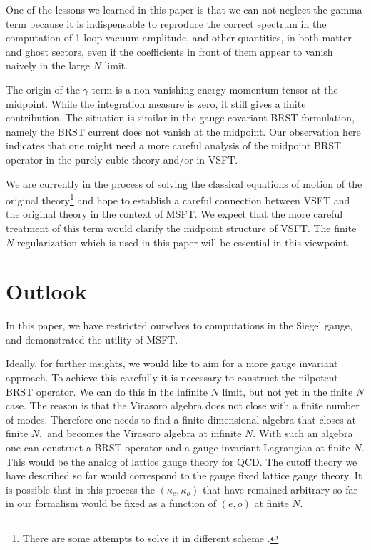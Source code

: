 \documentclass[a4paper,11pt]{article}
\begin{document}
One of the lessons we learned in this paper is that we can not
neglect the gamma term because it is indispensable to reproduce
the correct spectrum in the computation of 1-loop vacuum
amplitude, and other quantities, in both matter and ghost sectors,
even if the coefficients in front of them appear to vanish naively
in the large $N$ limit.

The origin of the $\gamma$ term is a non-vanishing energy-momentum
tensor at the midpoint.  While the integration measure is zero, it
still gives a finite contribution. The situation is similar in the
gauge covariant BRST formulation, namely the BRST current does not
vanish at the midpoint. Our observation here indicates that one
might need a more careful analysis of the midpoint BRST operator
in the purely cubic theory and/or in VSFT.

We are currently in the process of solving the classical equations of
motion of the original theory\footnote{%
There are some attempts to solve it in different scheme
\cite{solution}.} and hope to establish a careful connection
between VSFT and the original theory in the context of MSFT. We
expect that the more careful treatment of this term would clarify
the midpoint structure of VSFT. The finite $N$ regularization
which is used in this paper will be essential in this viewpoint.

\section{Outlook}

In this paper, we have restricted ourselves to computations in the Siegel
gauge, and demonstrated the utility of MSFT.

Ideally, for further insights, we would like to aim for a more gauge
invariant approach. To achieve this carefully it is necessary to construct
the nilpotent BRST operator. We can do this in the infinite $N$ limit, but
not yet in the finite $N$ case. The reason is that the Virasoro algebra does
not close with a finite number of modes. Therefore one needs to find a
finite dimensional algebra that closes at finite $N,$ and becomes the
Virasoro algebra at infinite $N.$ With such an algebra one can construct a
BRST operator and a gauge invariant Lagrangian at finite $N.$ This would be
the analog of lattice gauge theory for QCD. The cutoff theory we have
described so far would correspond to the gauge fixed lattice gauge theory.
It is possible that in this process the $\left( \kappa _{e},\kappa
_{o}\right) $ that have remained arbitrary so far in our formalism would be
fixed as a function of $\left( e,o\right) $ at finite $N.$
\end{document}
